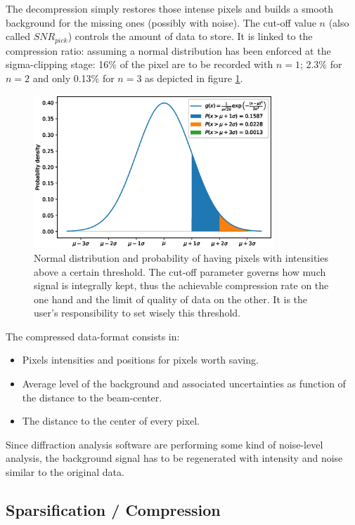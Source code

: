 \documentclass[preprint]{iucr}              %
\begin{document}
The decompression simply restores those intense pixels and builds a smooth background for the missing ones (possibly with noise).
The cut-off value $n$ (also called $SNR_{pick}$) controls the amount of data to store. 
It is linked to the compression ratio: assuming a normal distribution has been enforced at the sigma-clipping stage: 16\% of the pixel are to be recorded with $n=1$;  2.3\% for $n=2$ and only 0.13\% for $n=3$ as depicted in figure \ref{distribution}.
\begin{figure}
\label{distribution}
\begin{center}
\includegraphics[width=9cm]{distribution}
\caption{Normal distribution and probability of having pixels with intensities above a certain threshold.
The cut-off parameter governs how much signal is integrally kept, thus the achievable compression rate on the one hand and the limit of quality of data on the other. It is the user's responsibility to set wisely this threshold.}
\end{center}
\end{figure}

The compressed data-format consists in:
\begin{itemize}
    \item Pixels intensities and positions for pixels worth saving.
    \item Average level of the background and associated uncertainties as function of the distance to the beam-center.
    \item The distance to the center of every pixel.
\end{itemize}
Since diffraction analysis software are performing some kind of noise-level analysis, the background signal has to be regenerated with intensity and noise similar to the original data.


\subsection{Sparsification / Compression}
\end{document}
